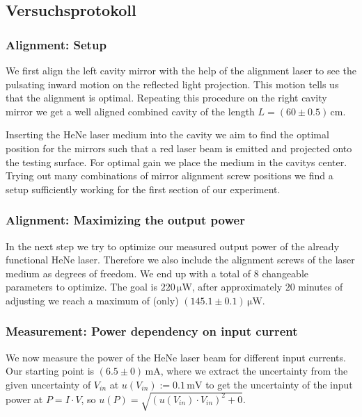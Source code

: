 \documentclass[../../main.tex]{subfiles}
\begin{document}
    \subsection*{Versuchsprotokoll} 
    \subsubsection{Alignment: Setup}\label{subsubsec:AlignmentSetup}
        We first align the left cavity mirror with the help of the alignment laser to see the pulsating inward motion on the reflected light projection. This motion tells us that the alignment is optimal. Repeating this procedure on the right cavity mirror we get a well aligned combined cavity of the length $L = (60\pm 0.5)\,\si{\cm}$.

        Inserting the HeNe laser medium into the cavity we aim to find the optimal position for the mirrors such that a red laser beam is emitted and projected onto the testing surface. For optimal gain we place the medium in the cavitys center. Trying out many combinations of mirror alignment screw positions we find a setup sufficiently working for the first section of our experiment. 

    \subsubsection{Alignment: Maximizing the output power}\label{subsubsec:AlignmentMaxPower}
        In the next step we try to optimize our measured output power of the already functional HeNe laser. Therefore we also include the alignment screws of the laser medium as degrees of freedom. We end up with a total of $8$ changeable parameters to optimize. The goal is $220\,\si{\micro\watt}$, after approximately $20$ minutes of adjusting we reach a maximum of (only) $(145.1\pm 0.1)\,\si{\micro\watt}$. 

    \subsubsection{Measurement: Power dependency on input current}\label{subsubsec:MeasurementPowerdependencyOnCurrent}
        We now measure the power of the HeNe laser beam for different input currents. Our starting point is $(6.5\pm 0)\,\si{\mA}$, where we extract the uncertainty from the given uncertainty of $V_{\textit{in}}$ at $u(V_{\textit{in}}):=0.1\,\si{\mV}$ to get the uncertainty of the input power at $P = I\cdot V$, so $u(P) = \sqrt{(u(V_{\textit{in}})\cdot V_{\textit{in}})^2 + 0}$.
\end{document}
